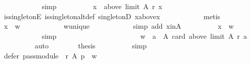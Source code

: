 \begin{isabellebody}
\ \ \ \ \ \ \ \ \ \ \isamarkupfalse%
\ simp\isanewline
\ \ \ \ \ \ \ \ \isamarkupfalse%
\ {\isachardoublequoteopen}{\isacharbraceleft}{\kern0pt}x{\isacharbraceright}{\kern0pt}\ {\isacharequal}{\kern0pt}\ above\ {\isacharparenleft}{\kern0pt}limit\ A\ r{\isacharparenright}{\kern0pt}\ x{\isachardoublequoteclose}\isanewline
\ \ \ \ \ \ \ \ \ \ \isamarkupfalse%
\ is{\isacharunderscore}{\kern0pt}singletonE\ is{\isacharunderscore}{\kern0pt}singleton{\isacharunderscore}{\kern0pt}altdef\ singletonD\ x{\isacharunderscore}{\kern0pt}above{\isacharunderscore}{\kern0pt}x\isanewline
\ \ \ \ \ \ \ \ \ \ \isamarkupfalse%
\ metis\isanewline
\ \ \ \ \ \ \ \ \isamarkupfalse%
\ {\isachardoublequoteopen}x\ {\isacharequal}{\kern0pt}\ w{\isachardoublequoteclose}\isanewline
\ \ \ \ \ \ \ \ \ \ \isamarkupfalse%
\ w{\isacharunderscore}{\kern0pt}unique\isanewline
\ \ \ \ \ \ \ \ \ \ \isamarkupfalse%
\ {\isacharparenleft}{\kern0pt}simp\ add{\isacharcolon}{\kern0pt}\ x{\isacharunderscore}{\kern0pt}in{\isacharunderscore}{\kern0pt}A{\isacharparenright}{\kern0pt}\isanewline
\ \ \ \ \ \ \ \ \isamarkupfalse%
\ {\isachardoublequoteopen}x\ {\isasymin}\ {\isacharbraceleft}{\kern0pt}w{\isacharbraceright}{\kern0pt}{\isachardoublequoteclose}\isanewline
\ \ \ \ \ \ \ \ \ \ \isamarkupfalse%
\ simp\isanewline
\ \ \ \ \ \ \isamarkupfalse%
\isanewline
\ \ \ \ \ \ \isamarkupfalse%
\ \isamarkupfalse%
\isanewline
\ \ \ \ \ \ \ \ {\isachardoublequoteopen}{\isacharbraceleft}{\kern0pt}w{\isacharbraceright}{\kern0pt}\ {\isacharequal}{\kern0pt}\ {\isacharbraceleft}{\kern0pt}a\ {\isasymin}\ A{\isachardot}{\kern0pt}\ card\ {\isacharparenleft}{\kern0pt}above\ {\isacharparenleft}{\kern0pt}limit\ A\ r{\isacharparenright}{\kern0pt}\ a{\isacharparenright}{\kern0pt}\ {\isasymle}\ {}{\isacharbraceright}{\kern0pt}{\isachardoublequoteclose}\isanewline
\ \ \ \ \ \ \ \ \isamarkupfalse%
\ auto\isanewline
\ \ \ \ \ \ \isamarkupfalse%
\ {\isacharquery}{\kern0pt}thesis\isanewline
\ \ \ \ \ \ \ \ \isamarkupfalse%
\ simp\isanewline
\ \ \ \ \isamarkupfalse%
\isanewline
\ \ \ \ \isamarkupfalse%
\ {\isachardoublequoteopen}defer\ {\isacharparenleft}{\kern0pt}pass{\isacharunderscore}{\kern0pt}module\ {}\ r{\isacharparenright}{\kern0pt}\ A\ p\ {\isacharequal}{\kern0pt}\ {\isacharbraceleft}{\kern0pt}w{\isacharbraceright}{\kern0pt}{\isachardoublequoteclose}\isanewline

\end{isabellebody}

